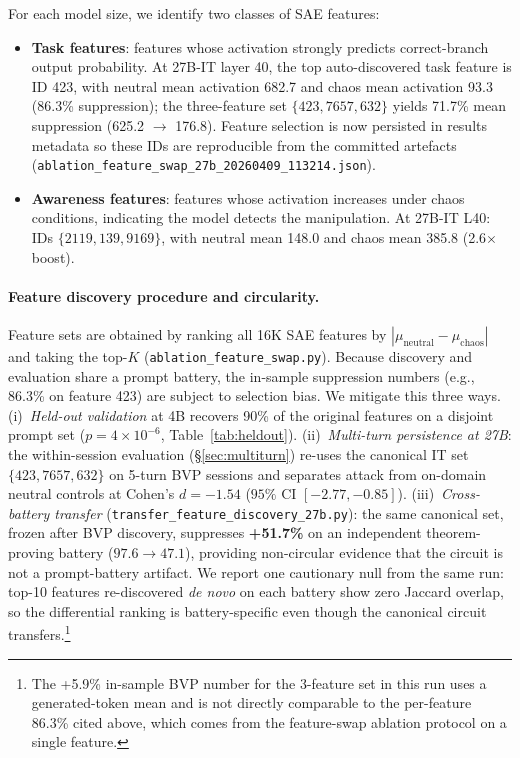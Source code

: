 \documentclass[10pt,twocolumn]{article}
\begin{document}
For each model size, we identify two classes of SAE features:
\begin{itemize}
    \item \textbf{Task features}: features whose activation strongly predicts correct-branch output probability. At 27B-IT layer 40, the top auto-discovered task feature is ID 423, with neutral mean activation 682.7 and chaos mean activation 93.3 (86.3\% suppression); the three-feature set $\{423, 7657, 632\}$ yields 71.7\% mean suppression (625.2 $\to$ 176.8). Feature selection is now persisted in results metadata so these IDs are reproducible from the committed artefacts (\texttt{ablation\_feature\_swap\_27b\_20260409\_113214.json}).
    \item \textbf{Awareness features}: features whose activation increases under chaos conditions, indicating the model detects the manipulation. At 27B-IT L40: IDs $\{2119, 139, 9169\}$, with neutral mean 148.0 and chaos mean 385.8 (2.6$\times$ boost).
\end{itemize}

\paragraph{Feature discovery procedure and circularity.}
Feature sets are obtained by ranking all 16K SAE features by $|\mu_{\text{neutral}} - \mu_{\text{chaos}}|$ and taking the top-$K$ (\texttt{ablation\_feature\_swap.py}).
Because discovery and evaluation share a prompt battery, the in-sample suppression numbers (e.g., 86.3\% on feature 423) are subject to selection bias.
We mitigate this three ways.
(i)~\emph{Held-out validation} at 4B recovers 90\% of the original features on a disjoint prompt set ($p = 4 \times 10^{-6}$, Table~\ref{tab:heldout}).
(ii)~\emph{Multi-turn persistence at 27B}: the within-session evaluation (\S\ref{sec:multiturn}) re-uses the canonical IT set $\{423, 7657, 632\}$ on 5-turn BVP sessions and separates attack from on-domain neutral controls at Cohen's $d = -1.54$ ($95\%$ CI $[-2.77, -0.85]$).
(iii)~\emph{Cross-battery transfer} (\texttt{transfer\_feature\_discovery\_27b.py}): the same canonical set, frozen after BVP discovery, suppresses \textbf{+51.7\%} on an independent theorem-proving battery ($97.6 \to 47.1$), providing non-circular evidence that the circuit is not a prompt-battery artifact.
We report one cautionary null from the same run: top-10 features re-discovered \emph{de novo} on each battery show zero Jaccard overlap, so the differential ranking is battery-specific even though the canonical circuit transfers.\footnote{The +5.9\% in-sample BVP number for the 3-feature set in this run uses a generated-token mean and is not directly comparable to the per-feature 86.3\% cited above, which comes from the feature-swap ablation protocol on a single feature.}
\end{document}
